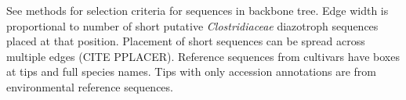 See methods for selection criteria for sequences in backbone tree. Edge width is proportional to number of short putative \textit{Clostridiaceae} diazotroph sequences placed at that position. Placement of short sequences can be spread across multiple edges (CITE PPLACER). Reference sequences from cultivars have boxes at tips and full species names. Tips with only accession annotations are from environmental reference sequences.
